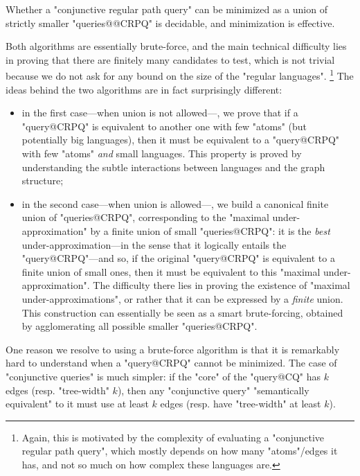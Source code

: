 \begin{contribution}
	Whether a "conjunctive regular path query" can be minimized
	as a union of strictly smaller "queries@@CRPQ" is decidable,
	and minimization is effective.
\end{contribution}

Both algorithms are essentially brute-force, and the main technical difficulty
lies in proving that there are finitely many candidates to test, which is not
trivial because we do not ask for any bound on the size of the "regular languages".%
\footnote{Again, this is motivated by the complexity of evaluating
a "conjunctive regular path query", which mostly depends on how many "atoms"/edges it has,
and not so much on how complex these languages are.}
The ideas behind the two algorithms are in fact surprisingly different:
\begin{itemize}
	\item in the first case---when union is not allowed---, we prove that
		if a "query@CRPQ" is equivalent to another one with few
		"atoms" (but potentially big languages), then it must be
		equivalent to a "query@CRPQ" with few "atoms" \emph{and} small languages.
		This property is proved by understanding the subtle interactions between
		languages and the graph structure;
	\item in the second case---when union is allowed---, we build a canonical
		finite union of "queries@CRPQ", corresponding to the
		"maximal under-approximation" by a finite union of small "queries@CRPQ": 
		it is the \emph{best} under-approximation---in the sense that
		it logically entails the "query@CRPQ"---and so, if the original
		"query@CRPQ" is equivalent to a finite union of small ones, then
		it must be equivalent to this "maximal under-approximation".
		The difficulty there lies in proving the existence of "maximal under-approximations",
		or rather that it can be expressed by a \emph{finite} union.
		This construction can essentially be seen as a
		smart brute-forcing, obtained by agglomerating all possible smaller "queries@CRPQ".
\end{itemize}

One reason we resolve to using a brute-force algorithm is that it is
remarkably hard to understand when a "query@CRPQ" cannot be minimized.
The case of "conjunctive queries" is much simpler: if the "core" 
of the "query@CQ" has $k$ edges (resp. "tree-width" $k$),
then any "conjunctive query" "semantically equivalent" to it must use at least $k$ edges
(resp. have "tree-width" at least $k$).


